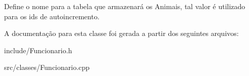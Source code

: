 Define o nome para a tabela que armazenará os Animais, tal valor é utilizado para os ids de autoincremento. 

A documentação para esta classe foi gerada a partir dos seguintes arquivos\+:\begin{DoxyCompactItemize}
\item 
include/Funcionario.\+h\item 
src/classes/Funcionario.\+cpp\end{DoxyCompactItemize}
